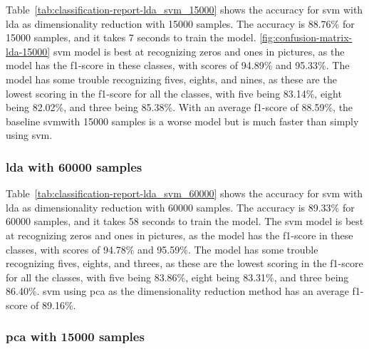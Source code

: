 Table~\ref{tab:classification-report-lda_svm_15000} shows the accuracy for \gls{svm} with \gls{lda} as dimensionality reduction with 15000 samples. The accuracy is 88.76\% for 15000 samples, and it takes 7 seconds to train the model. \autoref{fig:confusion-matrix-lda-15000} \gls{svm} model is best at recognizing zeros and ones in pictures, as the model has the f1-score in these classes, with scores of 94.89\% and 95.33\%. The model has some trouble recognizing fives, eights, and nines, as these are the lowest scoring in the f1-score for all the classes, with five being 83.14\%, eight being 82.02\%, and three being 85.38\%. With an average f1-score of 88.59\%, the baseline \gls{svm}with 15000 samples is a worse model but is much faster than simply using \gls{svm}.
\subsubsection{\gls{lda} with 60000 samples}\label{subsubsec:experiment-1-results-lda-60000}





Table~\ref{tab:classification-report-lda_svm_60000} shows the accuracy for \gls{svm} with \gls{lda} as dimensionality reduction with 60000 samples. The accuracy is 89.33\% for 60000 samples, and it takes 58 seconds to train the model. The \gls{svm} model is best at recognizing zeros and ones in pictures, as the model has the f1-score in these classes, with scores of 94.78\% and 95.59\%. The model has some trouble recognizing fives, eights, and threes, as these are the lowest scoring in the f1-score for all the classes, with five being 83.86\%, eight being 83.31\%, and three being 86.40\%. \gls{svm} using \gls{pca} as the dimensionality reduction method has an average f1-score of 89.16\%.

\subsubsection{\gls{pca} with 15000 samples}\label{subsubsec:experiment-1-results-pca-15000}





